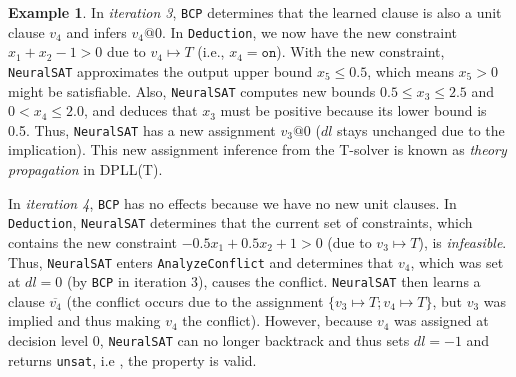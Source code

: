 \documentclass[oneside,11pt,dvipsnames]{book}
\numberwithin{equation}{section}
\theoremstyle{definition}
\newtheorem{example}{Example}[section]
\theoremstyle{remark}
\newcommand{\tvn}[1]{\iftoggle{usecomment}{{\color{red}{[TVN]: #1}}}{}}
\newcommand{\hd}[1]{\iftoggle{usecomment}{{\color{blue}{[HD]: #1}}}{}}
\newcommand{\neuralsat}{\texttt{NeuralSAT}}
\newcommand{\unsat}{\texttt{unsat}}
\begin{document}
\begin{example}
In \emph{iteration 3}, \texttt{BCP} determines that the learned clause is also a unit clause $v_4$ and infers $v_4@0$. In \texttt{Deduction}, we now have the new constraint $x_1 + x_2 - 1 > 0$ due to $v_4 \mapsto T$ (i.e., $x_4=\texttt{on}$).  With the new constraint, \neuralsat{}
approximates the output upper bound $x_5 \le  0.5$, which means $x_5>0$ might be satisfiable.
Also, \neuralsat{} computes new bounds $0.5 \le x_3 \le 2.5$ and $0 < x_4 \le 2.0$, and deduces that $x_3$ must be positive because its lower bound is 0.5.
Thus, \neuralsat{} has a new assignment $v_3@0$ ($dl$ stays unchanged due to the implication).
This new assignment inference from the T-solver is known as \emph{theory propagation} in DPLL(T).

In \emph{iteration 4}, \texttt{BCP} has no effects because we have no new unit clauses.  In \texttt{Deduction}, \neuralsat{} determines that the current set of constraints, which contains the new constraint $-0.5x_1+0.5x_2+1 > 0$ (due to $v_3 \mapsto T$), is \emph{infeasible}. Thus, \neuralsat{} enters \texttt{AnalyzeConflict} and determines that $v_4$, which was set at $dl=0$ (by \texttt{BCP} in iteration 3), causes the conflict.
\neuralsat{} then learns a clause $\overline{v_4}$ (the conflict occurs due to the assignment $\{v_3 \mapsto T; v_4 \mapsto T\}$, but $v_3$ was implied and thus making $v_4$ the conflict).
However, because $v_4$ was assigned at decision level 0, \neuralsat{} can no longer backtrack and thus sets $dl=-1$ and returns \unsat{}, i.e , the property is valid.





\end{example}
\end{document}
